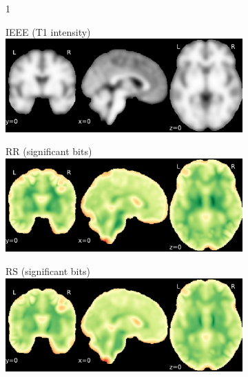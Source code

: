 \documentclass{article}
\begin{document}
\begin{appendices}
\begin{landscape}
\begin{figure}
            \vspace*{-2cm}
            \centering
            \begin{subfigure}[b][][c]{0.01\paperwidth} 1 \vspace*{-45pt} \end{subfigure}
            \begin{subfigure}[t]{0.2\paperheight}
                \centering
                IEEE (T1 intensity)
                \includegraphics[width=\textwidth]{figures/sig/10mm/ieee_ds001600_sub-1.pdf}
            \end{subfigure}
            \begin{subfigure}[t]{0.2\paperheight}
                \centering
                RR (significant bits)
                \includegraphics[width=\textwidth]{figures/sig/10mm/rr_ds001600_sub-1_sig.pdf}
            \end{subfigure}
            \begin{subfigure}[t]{0.2\paperheight}
                \centering
                RS (significant bits)
                \includegraphics[width=\textwidth]{figures/sig/10mm/rs_ds001600_sub-1_sig.pdf}

\end{subfigure}
\end{figure}
\end{landscape}
\end{appendices}
\end{document}
